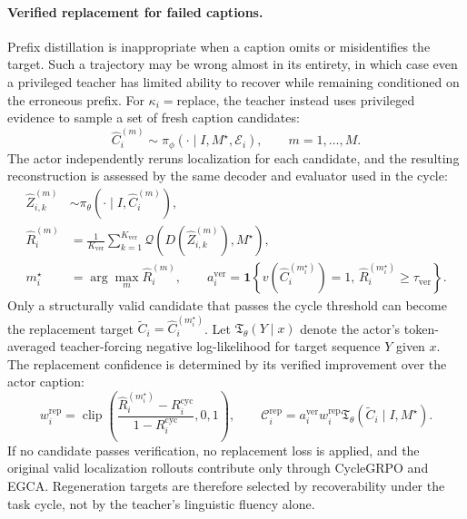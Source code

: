 \documentclass{article}
\begin{document}
\paragraph{Verified replacement for failed captions.}
Prefix distillation is inappropriate when a caption omits or misidentifies the target. Such a trajectory may be wrong almost in its entirety, in which case even a privileged teacher has limited ability to recover while remaining conditioned on the erroneous prefix. For $\kappa_i=\mathrm{replace}$, the teacher instead uses privileged evidence to sample a set of fresh caption candidates:
\begin{equation}\label{eq:regeneration-candidates}
 \widehat C_i^{(m)}\sim\pi_\phi(\cdot\mid I,M^\star,\mathcal E_i),
 \qquad m=1,\ldots,M.
\end{equation}
The actor independently reruns localization for each candidate, and the resulting reconstruction is assessed by the same decoder and evaluator used in the cycle:
\begin{equation}\label{eq:regeneration-verification}\begin{aligned}
 \widehat Z_{i,k}^{(m)}&\sim\pi_\theta(\cdot\mid I,\widehat C_i^{(m)}),\\
 \widehat R_i^{(m)}&=\frac{1}{K_{\mathrm{ver}}}\sum_{k=1}^{K_{\mathrm{ver}}}
 \mathcal Q\!\left(D(\widehat Z_{i,k}^{(m)}),M^\star\right),\\
 m_i^\star&=\arg\max_m\widehat R_i^{(m)},\qquad
 a_i^{\mathrm{ver}}=\mathbf 1\!\left\{
 v(\widehat C_i^{(m_i^\star)})=1,\,
 \widehat R_i^{(m_i^\star)}\ge\tau_{\mathrm{ver}}
 \right\}.
\end{aligned}\end{equation}
Only a structurally valid candidate that passes the cycle threshold can become the replacement target
$\widetilde C_i=\widehat C_i^{(m_i^\star)}$. Let $\mathfrak T_\theta(Y\mid x)$ denote the actor's token-averaged teacher-forcing negative log-likelihood for target sequence $Y$ given $x$. The replacement confidence is determined by its verified improvement over the actor caption:
\begin{equation}\label{eq:regeneration}
 w_i^{\mathrm{rep}}=\operatorname{clip}\!\left(
 \frac{\widehat R_i^{(m_i^\star)}-R_i^{\mathrm{cyc}}}{1-R_i^{\mathrm{cyc}}},0,1
 \right),\qquad
 \mathcal C_i^{\mathrm{rep}}=a_i^{\mathrm{ver}}w_i^{\mathrm{rep}}
 \mathfrak T_\theta(\widetilde C_i\mid I,M^\star).
\end{equation}
If no candidate passes verification, no replacement loss is applied, and the original valid localization rollouts contribute only through CycleGRPO and EGCA. Regeneration targets are therefore selected by recoverability under the task cycle, not by the teacher's linguistic fluency alone.
\end{document}
